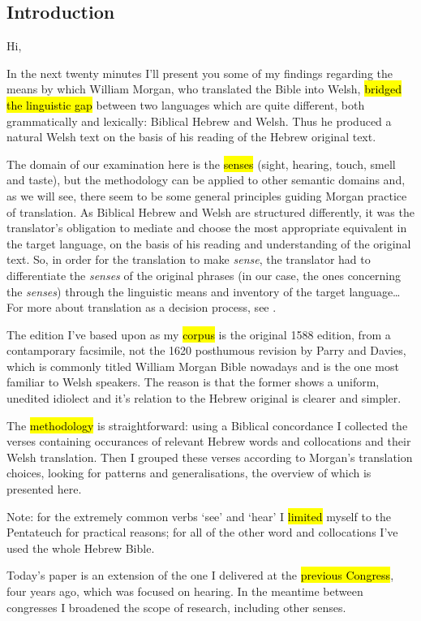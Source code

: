 \begin{paper}
	\section{Introduction}

	{\click} Hi,

	{\click} In the next twenty minutes I’ll present you some of my findings regarding the means by which William Morgan, who translated the Bible into Welsh, \hl{bridged the linguistic gap} between two languages which are quite different, both grammatically and lexically: Biblical Hebrew and Welsh. Thus he produced a natural Welsh text on the basis of his reading of the Hebrew original text.

	The domain of our examination here is the \hl{senses} (sight, hearing, touch, smell and taste), but the methodology can be applied to other semantic domains and, as we will see, there seem to be some general principles guiding Morgan practice of translation. As Biblical Hebrew and Welsh are structured differently, it was the translator’s obligation to mediate and choose the most appropriate equivalent in the target language, on the basis of his reading and understanding of the original text. So, in order for the translation to make \emph{sense}, the translator had to differentiate the \emph{senses} of the original phrases (in our case, the ones concerning the \emph{senses}) through the linguistic means and inventory of the target language… For more about translation as a decision process, see \cite{levy.j:1967:translation}.

	{\click} The edition I’ve based upon as my \hl{corpus} is the original 1588 edition, from a contamporary facsimile, not the 1620 posthumous revision by Parry and Davies, which is commonly titled William Morgan Bible nowadays and is the one most familiar to Welsh speakers. The reason is that the former shows a uniform, unedited idiolect and it’s relation to the Hebrew original is clearer and simpler.

	{\click} The \hl{methodology} is straightforward: using a Biblical concordance I collected the verses containing occurances of relevant Hebrew words and collocations and their Welsh translation. Then I grouped these verses according to Morgan’s translation choices, looking for patterns and generalisations, the overview of which is presented here.
	
	{\click} Note: for the extremely common verbs  ‘see’ and  ‘hear’ I \hl{limited} myself to the Pentateuch for practical reasons; for all of the other word and collocations I’ve used the whole Hebrew Bible.

	{\click} Today’s paper is an extension of the one I delivered at the \hl{previous Congress}, four years ago, which was focused on hearing. In the meantime between congresses I broadened the scope of research, including other senses.
\end{paper}
